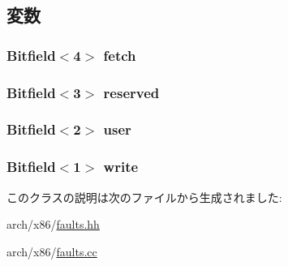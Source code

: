 \subsection{変数}
\hypertarget{classX86ISA_1_1PageFault_adc843c49c832b796abd2f483d4fd45cc}{
\subsubsection[{fetch}]{\setlength{\rightskip}{0pt plus 5cm}Bitfield$<$4$>$ {\bf fetch}}}
\label{classX86ISA_1_1PageFault_adc843c49c832b796abd2f483d4fd45cc}
\hypertarget{classX86ISA_1_1PageFault_a5858891cfed455f1cea3c680b8adefad}{
\subsubsection[{reserved}]{\setlength{\rightskip}{0pt plus 5cm}Bitfield$<$3$>$ {\bf reserved}}}
\label{classX86ISA_1_1PageFault_a5858891cfed455f1cea3c680b8adefad}
\hypertarget{classX86ISA_1_1PageFault_adc1042328d36e83e5c72a380f2c97697}{
\subsubsection[{user}]{\setlength{\rightskip}{0pt plus 5cm}Bitfield$<$2$>$ {\bf user}}}
\label{classX86ISA_1_1PageFault_adc1042328d36e83e5c72a380f2c97697}
\hypertarget{classX86ISA_1_1PageFault_afbbfc21831d777494ed9d797bd9870a1}{
\subsubsection[{write}]{\setlength{\rightskip}{0pt plus 5cm}Bitfield$<$1$>$ {\bf write}}}
\label{classX86ISA_1_1PageFault_afbbfc21831d777494ed9d797bd9870a1}


このクラスの説明は次のファイルから生成されました:\begin{DoxyCompactItemize}
\item 
arch/x86/\hyperlink{arch_2x86_2faults_8hh}{faults.hh}\item 
arch/x86/\hyperlink{arch_2x86_2faults_8cc}{faults.cc}\end{DoxyCompactItemize}

